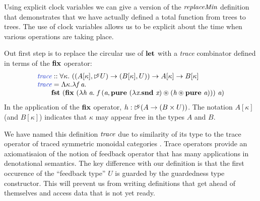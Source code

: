 Using explicit clock variables we can give a version of the
$\textit{replaceMin}$ definition that demonstrates that we have
actually defined a total function from trees to trees. The use of
clock variables allows us to be explicit about the time when various
operations are taking place.

Out first step is to replace the circular use of $\textbf{let}$ with a
\emph{trace} combinator defined in terms of the $\textbf{fix}$ operator:
\begin{displaymath}
  \begin{array}{l}
    \defn{trace} :: \forall \kappa.\ ((A[\kappa], \delay\kappa U) \to (B[\kappa], U)) \to A[\kappa] \to B[\kappa] \\
    \defn{trace} = \Lambda \kappa. \lambda \ident{f}\ \ident{a}. \\
    \quad\quad\kw{fst}\ (\kw{fix}\ (\lambda \ident{h}\ \ident{a}.\ \ident{f}\ (\ident{a}, \kw{pure}\ (\lambda \ident{x}. \kw{snd}\ \ident{x}) \circledast (\ident{h} \circledast \kw{pure}\ \ident{a})))\ \ident{a})
  \end{array}
\end{displaymath}
In the application of the $\textbf{fix}$ operator, $h : \mathord{\rhd\kern-0.4em^{\kappa}} (A
\to (B \times U))$.  The notation $A[\kappa]$ (and $B[\kappa]$)
indicates that $\kappa$ may appear free in the types $A$ and $B$. %

We have named this definition $\textit{trace}$ due to similarity of its
type to the trace operator of traced symmetric monoidal categories
\cite{something}. Trace operators provide an axiomatisaion of the
notion of feedback operator that has many applications in denotational
semantics. The key difference with our definition is that the first
occurence of the ``feedback type'' $U$ is guarded by the guardedness
type constructor. This will prevent us from writing definitions that
get ahead of themselves and access data that is not yet ready.

\newcommand{\hlchangem}[1]{\colorbox{greybg}{$#1$}}
\newcommand{\hlchange}[1]{\colorbox{greybg}{#1}}

